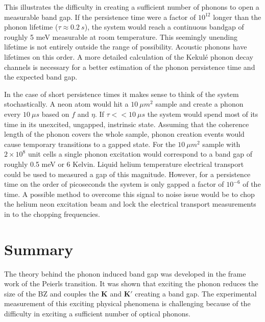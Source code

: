This illustrates the difficulty in creating a sufficient number of phonons to open a measurable band gap.
If the persistence time were a factor of $10^12$ longer than the phonon lifetime ($\tau \approx 0.2 \ s$), the system would reach a continuous bandgap of roughly 5 meV measurable at room temperature.
This seemingly unending lifetime is not entirely outside the range of possibility.
Acoustic phonons have lifetimes on this order.
A more detailed calculation of the Kekul\'e phonon decay channels is necessary for a better estimation of the phonon persistence time and the expected band gap.

In the case of short persistence times it makes sense to think of the system stochastically.
A neon atom would hit a $10 \ \mu m^2$ sample and create a phonon every $10 \ \mu s$ based on $f$ and $\eta$.
If $\tau << 10 \ \mu s$ the system would spend most of its time in its unexcited, ungapped, instrinsic state.
Assuming that the coherence length of the phonon covers the whole sample, phonon creation events would cause temporary transitions to a gapped state.
For the $10 \ \mu m^2$ sample with $2 \times 10^8$ unit cells a single phonon excitation would correspond to a band gap of roughly 0.5 meV or 6 Kelvin.
Liquid helium temperature electrical transport could be used to measured a gap of this magnitude.
However, for a persistence time on the order of picoseconds the system is only gapped a factor of $10^{-6}$ of the time.
A possible method to overcome this signal to noise issue would be to chop the helium neon excitation beam and lock the electrical transport measurements in to the chopping frequencies.

\section{Summary}
The theory behind the phonon induced band gap was developed in the frame work of the Peierls transition.
It was shown that exciting the phonon reduces the size of the BZ and couples the $\bm{K}$ and $\bm{K'}$ creating a band gap.
The experimental measurement of this exciting physical phenomena is challenging because of the difficulty in exciting a sufficient number of optical phonons.